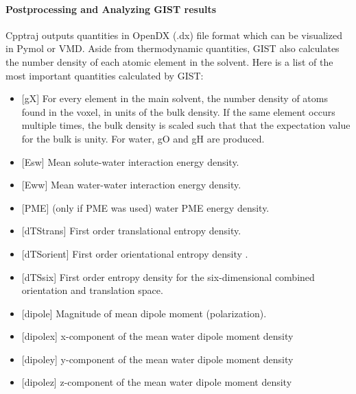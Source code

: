 \documentclass[9pt,tutorial]{livecoms}
\begin{document}
\paragraph{Postprocessing and Analyzing GIST results}
Cpptraj outputs quantities in OpenDX (.dx) file format which can be visualized in Pymol or VMD.
Aside from thermodynamic quantities, GIST also calculates the number density of each atomic element in the solvent.
Here is a list of the most important quantities calculated by GIST:

\begin{itemize}
	\item{[gX] For every element in the main solvent, the number density of atoms found in the voxel, in units of the bulk density. If the same element occurs multiple times, the bulk density is scaled such that that the expectation value for the bulk is unity. For water, gO and gH are produced.}

	\item{[Esw] Mean solute-water interaction energy density.}
	\item{[Eww] Mean water-water interaction energy density.}
	\item{[PME] (only if PME was used) water PME energy density.}
	\item{[dTStrans] First order translational entropy density.}
	\item{[dTSorient] First order orientational entropy density .}
	\item{[dTSsix] First order entropy density for the six-dimensional combined orientation and translation space.}
	\item{[dipole] Magnitude of mean dipole moment (polarization).}
	\item{[dipolex] x-component of the mean water dipole moment density}
	\item{[dipoley] y-component of the mean water dipole moment density}
	\item{[dipolez] z-component of the mean water dipole moment density}
\end{itemize}
\end{document}
